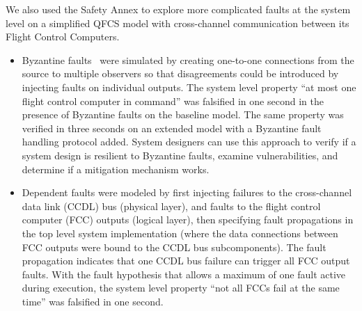 We also used the Safety Annex to explore more complicated faults at the system level on a simplified QFCS model with cross-channel communication between its Flight Control Computers.

\begin{itemize}
	\item Byzantine faults~\cite{Driscoll-Byzantine-Fault} were simulated by creating one-to-one connections from the source to multiple observers so that disagreements could be introduced by injecting faults on individual outputs. The system level property ``at most one flight control computer in command'' was falsified in one second in the presence of Byzantine faults on the baseline model. The same property was verified in three seconds on an extended model with a Byzantine fault handling protocol added.  System designers can use this approach to verify if a system design is resilient to Byzantine faults, examine vulnerabilities, and determine if a mitigation mechanism works.

	
	\item Dependent faults were modeled by first injecting failures to the cross-channel data link (CCDL) bus (physical layer), and faults to the flight control computer (FCC) outputs (logical layer), then specifying fault propagations in the top level system implementation (where the data connections between FCC outputs were bound to the CCDL bus subcomponents). The fault propagation indicates that one CCDL bus failure can trigger all FCC output faults. With the fault hypothesis that allows a maximum of one fault active during execution, the system level property ``not all FCCs fail at the same time'' was falsified in one second.
	
\end{itemize}

